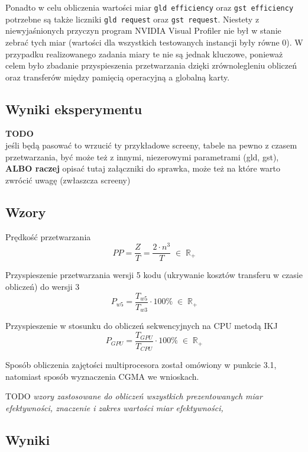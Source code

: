 \documentclass[12pt,a4paper]{article}
\begin{document}
Ponadto w celu obliczenia wartości miar \verb|gld efficiency| oraz \verb|gst efficiency| potrzebne są także liczniki  \verb|gld request| oraz  \verb|gst request|. Niestety z niewyjaśnionych przyczyn program NVIDIA Visual Profiler nie był w stanie zebrać tych  miar (wartości dla wszystkich testowanych instancji były równe 0). W przypadku realizowanego zadania miary te nie są jednak kluczowe, ponieważ celem było zbadanie przyspieszenia przetwarzania dzięki zrównolegleniu obliczeń oraz transferów między pamięcią operacyjną a globalną karty.


\subsection{Wyniki eksperymentu}

\textbf{TODO}\\
jeśli będą pasować to wrzucić ty przykładowe screeny, tabele na pewno z czasem przetwarzania, być może też z innymi, niezerowymi parametrami (gld, gst), \textbf{ALBO raczej} opisać tutaj załączniki do sprawka, może też na które warto zwrócić uwagę (zwłaszcza screeny)

\subsection{Wzory}

Prędkość przetwarzania
\begin{equation}
PP = \frac{Z}{T} = \frac{2 \cdot n^3}{T} \; \in \; \mathbb{R}_+
\end{equation}

Przyspieszenie przetwarzania wersji 5 kodu (ukrywanie kosztów transferu w czasie obliczeń) do wersji 3
\begin{equation}
P_{w5} = \frac{T_{w5}}{T_{w3}} \cdot 100\% \; \in \; \mathbb{R}_+
\end{equation}

Przyspieszenie w stosunku do obliczeń sekwencyjnych na CPU metodą IKJ
\begin{equation}
P_{GPU} = \frac{T_{GPU}}{T_{CPU}} \cdot 100\% \; \in \; \mathbb{R}_+
\end{equation}

Sposób obliczenia zajętości multiprocesora został omówiony w punkcie 3.1, natomiast sposób wyznaczenia CGMA we wnioskach.

TODO
\textit{wzory zastosowane do obliczeń wszystkich prezentowanych miar efektywności, znaczenie i zakres wartości
miar efektywności,}

\subsection{Wyniki}
\end{document}

